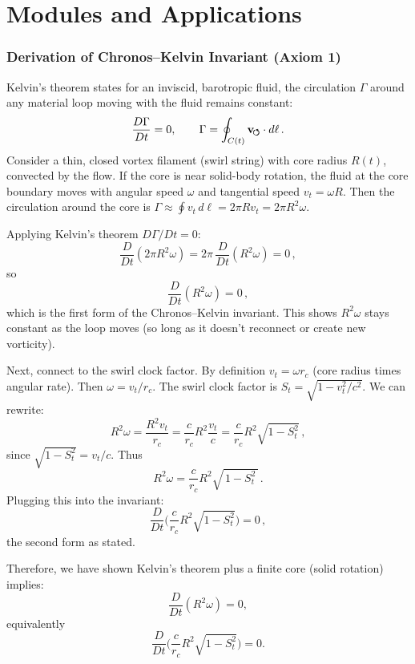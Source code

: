 
\part{Modules and Applications}
    \section{Derivation of Chronos–Kelvin Invariant (Axiom 1)}
        Kelvin’s theorem states for an inviscid, barotropic fluid, the circulation $\Gamma$ around any material loop moving with the fluid remains constant:
        \[
            \frac{D\Gamma}{Dt} = 0, \qquad \Gamma = \oint_{C(t)} \mathbf{v}_{\!\boldsymbol{\circlearrowleft}} \cdot d\ell\,.
        \]
        Consider a thin, closed vortex filament (swirl string) with core radius $R(t)$, convected by the flow. If the core is near solid-body rotation, the fluid at the core boundary moves with angular speed $\omega$ and tangential speed $v_t = \omega R$. Then the circulation around the core is $\Gamma \approx \oint v_t\,d\ell = 2\pi R v_t = 2\pi R^2 \omega$.

        Applying Kelvin’s theorem $D\Gamma/Dt=0$:
        \[
            \frac{D}{Dt}(2\pi R^2 \omega) = 2\pi\,\frac{D}{Dt}(R^2 \omega) = 0\,,
        \]
        so
        \[
            \frac{D}{Dt}(R^2 \omega) = 0\,,
        \]
        which is the first form of the Chronos–Kelvin invariant. This shows $R^2 \omega$ stays constant as the loop moves (so long as it doesn’t reconnect or create new vorticity).

        Next, connect to the swirl clock factor. By definition $v_t = \omega r_c$ (core radius times angular rate). Then $\omega = v_t/r_c$. The swirl clock factor is $S_t = \sqrt{1 - v_t^2/c^2}$. We can rewrite:
        \[
            R^2 \omega = \frac{R^2 v_t}{r_c} = \frac{c}{r_c} R^2 \frac{v_t}{c} = \frac{c}{r_c} R^2 \sqrt{1 - S_t^2}\,,
        \]
        since $\sqrt{1 - S_t^2} = v_t/c$. Thus
        \[
            R^2 \omega = \frac{c}{r_c} R^2 \sqrt{\,1 - S_t^2\,}\,.
        \]
        Plugging this into the invariant:
        \[
            \frac{D}{Dt}\Big(\frac{c}{r_c} R^2 \sqrt{1 - S_t^2}\Big) = 0\,,
        \]
        the second form as stated.

        Therefore, we have shown Kelvin’s theorem plus a finite core (solid rotation) implies:
        \[
            \frac{D}{Dt}(R^2 \omega) = 0,
        \]
        equivalently
        \[
            \frac{D}{Dt}\Big(\frac{c}{r_c}R^2\sqrt{1 - S_t^2}\Big) = 0.
        \]

